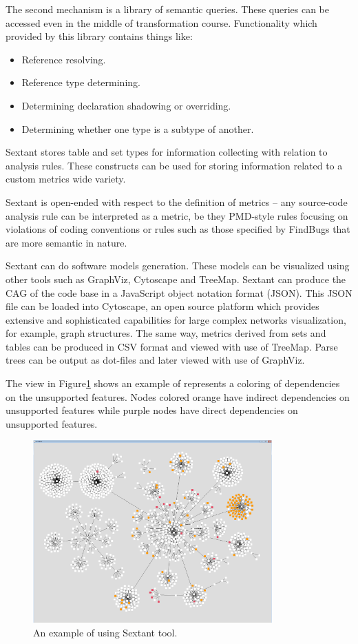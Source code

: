 The second mechanism is a library of semantic queries. These queries can be accessed even in the middle of transformation course. Functionality which provided by this library contains things like:
\begin{itemize}
	\item Reference resolving.
	\item Reference type determining.
	\item Determining declaration shadowing or overriding.
	\item Determining whether one type is a subtype of another.
\end{itemize}
 
Sextant stores table and set types for information collecting with relation to analysis rules. These constructs can be used for storing information related to a custom metrics wide variety.

Sextant is open-ended with respect to the definition of metrics – any source-code analysis rule can be interpreted as a metric, be they PMD-style rules focusing on violations of coding conventions or rules such as those specified by FindBugs that are more semantic in nature\cite{sextant}.

Sextant can do software models generation. These models can be visualized using other tools such as GraphViz, Cytoscape and TreeMap. Sextant can produce the CAG of the code base in a JavaScript object notation format (JSON). This JSON file can be loaded into Cytoscape, an open source platform which provides extensive and sophisticated capabilities for large complex networks visualization, for example, graph structures. The same way, metrics derived from sets and tables can be produced in CSV format and viewed with use of TreeMap. Parse trees can be output as dot-files and later viewed with use of GraphViz.

The view in Figure\ref{fig:1} shows an example of represents a coloring of dependencies on the unsupported features. Nodes colored orange have indirect dependencies on unsupported features while purple nodes have direct dependencies on unsupported features.

\begin{figure}[h]
	\centering
	\includegraphics[height=70mm]{figures/1.png}
	\caption{An example of using Sextant tool.}
	\label{fig:1}
\end{figure}

